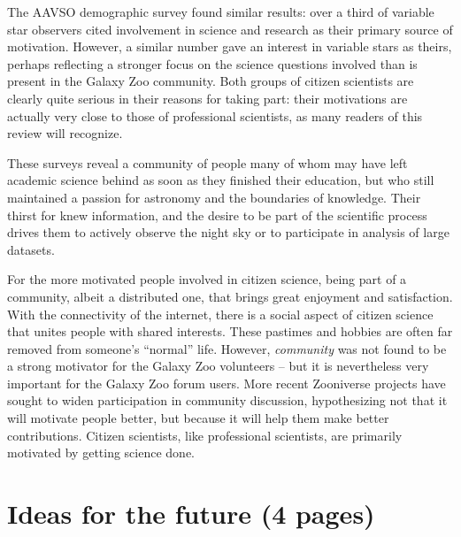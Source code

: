 \documentclass{ar2e}
\begin{document}
The AAVSO demographic survey \citep{P+P2012} found similar results: over a
third of variable star observers cited involvement in science and research as
their primary source of motivation. However, a similar number gave an interest
in variable stars as theirs, perhaps reflecting a stronger focus on the
science questions involved than is present in the Galaxy Zoo community. Both
groups of citizen scientists are clearly quite serious in their reasons for
taking part: their motivations are actually very close to those of
professional scientists, as many readers of this review will recognize.

These surveys reveal a community of people many of whom may have left  
academic science behind as soon as they finished their  education, but who
still maintained a passion for astronomy and the  boundaries of knowledge. 
Their thirst for knew information, and the  desire to be part of the 
scientific process drives them to actively observe the  night sky or to
participate in analysis of large datasets.  

For the more motivated people involved in citizen science, being part of a
community, 
albeit a distributed one, that brings great enjoyment and satisfaction.  With
the connectivity of the internet, there is a social  aspect of citizen science
that unites people with shared interests.   These pastimes and hobbies are
often far removed from someone's ``normal''  life. However, {\it community}
was not found to be a strong motivator for the Galaxy Zoo volunteers -- but it
is nevertheless very important for the Galaxy Zoo forum users. More recent
Zooniverse projects have sought to widen participation in community
discussion, hypothesizing not that it will motivate people better, but because
it will help them make better contributions. Citizen scientists, like
professional scientists, are primarily motivated by getting science done.








\section{Ideas for the future (4 pages)}
\label{sec:future}
\end{document}
